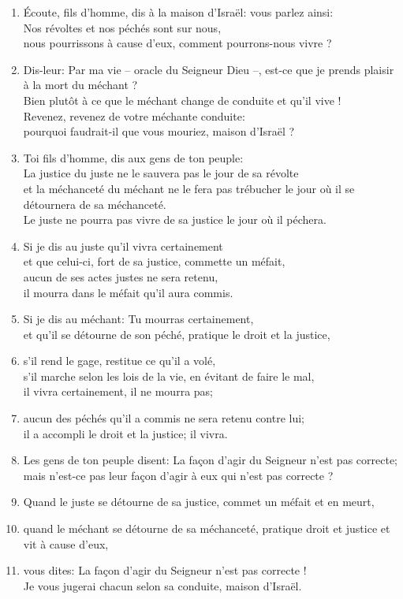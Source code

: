 \documentclass[12pt,a4paper,titlepage]{article}
\def \pslabelsep{0.2em} %
\def \psleftmargin{0em} %
\begin{document}
\begin{enumerate}[leftmargin=\psleftmargin, labelsep = \pslabelsep, label={\arabic*}, font=\color{\pscolor}\small\textsuperscript, parsep=0em, itemsep=0em, topsep=0em ]
\item Écoute, fils d’homme, dis à la maison d’Israël: vous parlez ainsi: \\ \og{}Nos révoltes et nos péchés sont sur nous, \\ nous pourrissons à cause d’eux, comment pourrons-nous vivre ?\fg{} 
\item Dis-leur: Par ma vie – oracle du Seigneur Dieu –, est-ce que je prends plaisir à la mort du méchant ? \\ Bien plutôt à ce que le méchant change de conduite et qu’il vive ! \\ Revenez, revenez de votre méchante conduite: \\ pourquoi faudrait-il que vous mouriez, maison d’Israël ?
\item Toi fils d’homme, dis aux gens de ton peuple: \\ La justice du juste ne le sauvera pas le jour de sa révolte \\ et la méchanceté du méchant ne le fera pas trébucher le jour où il se détournera de sa méchanceté.\\
Le juste ne pourra pas vivre de sa justice le jour où il péchera.
\item Si je dis au juste qu’il vivra certainement \\ et que celui-ci, fort de sa justice, commette un méfait, \\ aucun de ses actes justes ne sera retenu, \\ il mourra dans le méfait qu’il aura commis.
\item Si je dis au méchant: \og{}Tu mourras certainement\fg{}, \\ et qu’il se détourne de son péché, pratique le droit et la justice,
\item s’il rend le gage, restitue ce qu’il a volé, \\ s’il marche selon les lois de la vie, en évitant de faire le mal, \\ il vivra certainement, il ne mourra pas; 
\item aucun des péchés qu’il a commis ne sera retenu contre lui; \\ il a accompli le droit et la justice; il vivra. \verseSpace
\item Les gens de ton peuple disent: \og{}La façon d’agir du Seigneur n’est pas correcte\fg{}; \\ mais n’est-ce pas leur façon d’agir à eux qui n’est pas correcte ?
\item Quand le juste se détourne de sa justice, commet un méfait et en meurt,
\item quand le méchant se détourne de sa méchanceté, pratique droit et justice et vit à cause d’eux,
\item vous dites: \og{}La façon d’agir du Seigneur n’est pas correcte !\fg{} \\ Je vous jugerai chacun selon sa conduite, maison d’Israël. \parSpace


\end{enumerate}
\end{document}
